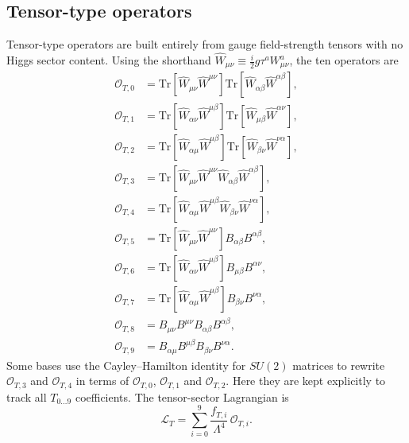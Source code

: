 \subsection{Tensor-type operators}

Tensor-type operators are built entirely from gauge field-strength tensors with no Higgs sector content. Using the shorthand $\hat{W}_{\mu\nu}\equiv\tfrac{i}{2}g\tau^a W_{\mu\nu}^a$, the ten operators are \cite{Eboli_2016}
\begin{align}
\mathcal{O}_{T,0} &= \mathrm{Tr}\!\left[\hat{W}_{\mu\nu}\hat{W}^{\mu\nu}\right] \mathrm{Tr}\!\left[\hat{W}_{\alpha\beta}\hat{W}^{\alpha\beta}\right], \\[3pt] \mathcal{O}_{T,1} &= \mathrm{Tr}\!\left[\hat{W}_{\alpha\nu}\hat{W}^{\mu\beta}\right] \mathrm{Tr}\!\left[\hat{W}_{\mu\beta}\hat{W}^{\alpha\nu}\right], \\[3pt] \mathcal{O}_{T,2} &= \mathrm{Tr}\!\left[\hat{W}_{\alpha\mu}\hat{W}^{\mu\beta}\right] \mathrm{Tr}\!\left[\hat{W}_{\beta\nu}\hat{W}^{\nu\alpha}\right], \\[3pt] \mathcal{O}_{T,3} &= \mathrm{Tr}\!\left[\hat{W}_{\mu\nu}\hat{W}^{\mu\nu}\hat{W}_{\alpha\beta}\hat{W}^{\alpha\beta}\right], \\[3pt] \mathcal{O}_{T,4} &= \mathrm{Tr}\!\left[\hat{W}_{\alpha\mu}\hat{W}^{\mu\beta}\hat{W}_{\beta\nu}\hat{W}^{\nu\alpha}\right], \\[3pt] \mathcal{O}_{T,5} &= \mathrm{Tr}\!\left[\hat{W}_{\mu\nu}\hat{W}^{\mu\nu}\right] B_{\alpha\beta}B^{\alpha\beta}, \\[3pt] \mathcal{O}_{T,6} &= \mathrm{Tr}\!\left[\hat{W}_{\alpha\nu}\hat{W}^{\mu\beta}\right] B_{\mu\beta}B^{\alpha\nu}, \\[3pt] \mathcal{O}_{T,7} &= \mathrm{Tr}\!\left[\hat{W}_{\alpha\mu}\hat{W}^{\mu\beta}\right] B_{\beta\nu}B^{\nu\alpha}, \\[3pt] \mathcal{O}_{T,8} &= B_{\mu\nu}B^{\mu\nu}B_{\alpha\beta}B^{\alpha\beta}, \\[3pt] \mathcal{O}_{T,9} &= B_{\alpha\mu}B^{\mu\beta}B_{\beta\nu}B^{\nu\alpha}.
\end{align}
Some bases use the Cayley--Hamilton identity for $SU(2)$ matrices to rewrite $\mathcal{O}_{T,3}$ and $\mathcal{O}_{T,4}$ in terms of $\mathcal{O}_{T,0}$, $\mathcal{O}_{T,1}$ and $\mathcal{O}_{T,2}$. Here they are kept explicitly to track all $T_{0\ldots 9}$ coefficients. The tensor-sector Lagrangian is
\begin{equation}
\mathcal{L}_{T} = \sum_{i=0}^{9} \frac{f_{T,i}}{\Lambda^{4}}\,\mathcal{O}_{T,i}.
\end{equation}
